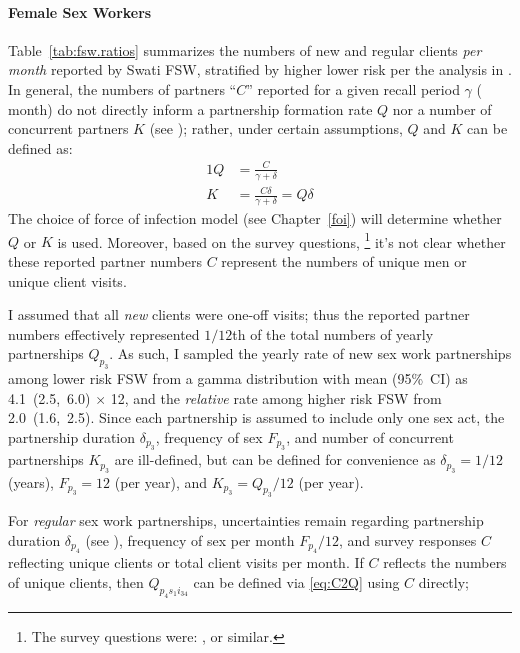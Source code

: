 \paragraph{Female Sex Workers}
Table~\ref{tab:fsw.ratios} summarizes
the numbers of new and regular clients \emph{per month} reported by Swati FSW,
stratified by higher \vs lower risk per the analysis in .
In general, the numbers of partners ``$C$'' reported
for a given recall period $\gamma$ ( month)
do not directly inform a partnership formation rate $Q$ nor a number of concurrent partners $K$
(see );
rather, under certain assumptions, $Q$ and $K$ can be defined as:
\begin{alignat}{1}
  Q &= \frac{C}{\gamma+\delta} \label{eq:C2Q}\\
  K &= \frac{C\delta}{\gamma+\delta} = Q\delta \label{eq:C2K}
\end{alignat}
The choice of force of infection model (see Chapter~\ref{foi})
will determine whether $Q$ or $K$ is used.
Moreover, based on the survey questions,%
\footnote{The survey questions were: , or similar.}
it's not clear whether these reported partner numbers $C$
represent the numbers of unique men or unique client visits.
\par
I assumed that all \emph{new} clients were one-off visits;
thus the reported partner numbers effectively represented
$1/12$th of the total numbers of yearly partnerships $Q_{p_{3}}$.
As such, I sampled the yearly rate of new sex work partnerships among lower risk FSW
from a gamma distribution with mean (95\%~CI) as 4.1~(2.5,~6.0) $\times$ 12,
and the \emph{relative} rate among higher risk FSW from 2.0~(1.6,~2.5).
Since each partnership is assumed to include only one sex act,
the partnership duration $\delta_{p_{3}}$, frequency of sex $F_{p_{3}}$,
and number of concurrent partnerships $K_{p_{3}}$ are ill-defined,
but can be defined for convenience as
$\delta_{p_{3}} = 1/12$ (years), $F_{p_{3}} = 12$ (per year),
and $K_{p_{3}} = Q_{p_{3}} / 12$ (per year).
\par
For \emph{regular} sex work partnerships, uncertainties remain regarding
partnership duration $\delta_{p_{4}}$ (see ),
frequency of sex per month $F_{p_{4}}/12$, and
survey responses $C$ reflecting unique clients or total client visits per month.
If $C$ reflects the numbers of unique clients, then
$Q_{p_{4}s_{1}i_{34}}$ can be defined via \eqref{eq:C2Q} using $C$ directly;
